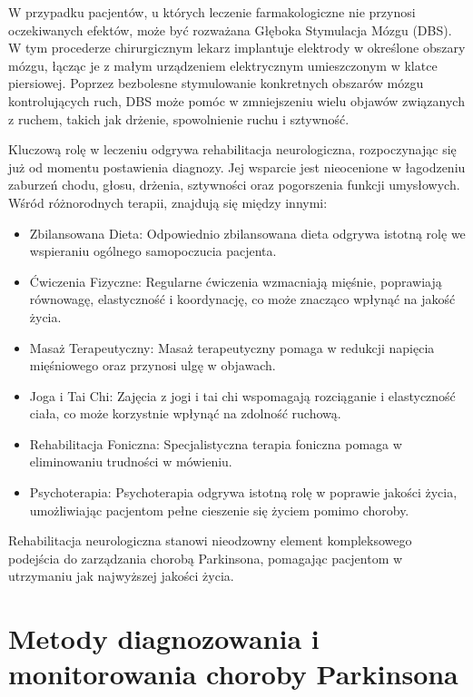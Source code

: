 W przypadku pacjentów, u których leczenie farmakologiczne nie przynosi oczekiwanych efektów, może być rozważana Głęboka Stymulacja Mózgu (DBS).
W tym procederze chirurgicznym lekarz implantuje elektrody w określone obszary mózgu, łącząc je z małym urządzeniem elektrycznym umieszczonym w klatce piersiowej.
Poprzez bezbolesne stymulowanie konkretnych obszarów mózgu kontrolujących ruch, DBS może pomóc w zmniejszeniu wielu objawów związanych z ruchem,
takich jak drżenie, spowolnienie ruchu i sztywność.

Kluczową rolę w leczeniu odgrywa rehabilitacja neurologiczna, rozpoczynając się już od momentu postawienia diagnozy.
Jej wsparcie jest nieocenione w łagodzeniu zaburzeń chodu, głosu, drżenia, sztywności oraz pogorszenia funkcji umysłowych.
Wśród różnorodnych terapii, znajdują się między innymi:
\begin{itemize}[itemsep=0.1pt]
	\item Zbilansowana Dieta: Odpowiednio zbilansowana dieta odgrywa istotną rolę we wspieraniu ogólnego samopoczucia pacjenta.
	\item Ćwiczenia Fizyczne: Regularne ćwiczenia wzmacniają mięśnie, poprawiają równowagę, elastyczność i koordynację, co może znacząco wpłynąć na jakość życia.
	\item Masaż Terapeutyczny: Masaż terapeutyczny pomaga w redukcji napięcia mięśniowego oraz przynosi ulgę w objawach.
	\item Joga i Tai Chi: Zajęcia z jogi i tai chi wspomagają rozciąganie i elastyczność ciała, co może korzystnie wpłynąć na zdolność ruchową.
	\item Rehabilitacja Foniczna: Specjalistyczna terapia foniczna pomaga w eliminowaniu trudności w mówieniu.
	\item Psychoterapia: Psychoterapia odgrywa istotną rolę w poprawie jakości życia, umożliwiając pacjentom pełne cieszenie się życiem pomimo choroby.
\end{itemize}

Rehabilitacja neurologiczna stanowi nieodzowny element kompleksowego podejścia do zarządzania chorobą Parkinsona, pomagając pacjentom w utrzymaniu jak najwyższej jakości życia.


\section{Metody diagnozowania i monitorowania choroby Parkinsona}
\label{subsec:diagnostyka}

